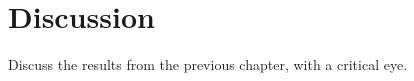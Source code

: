 
\chapter{Discussion}
Discuss the results from the previous chapter, with a critical eye.
\cleardoublepage